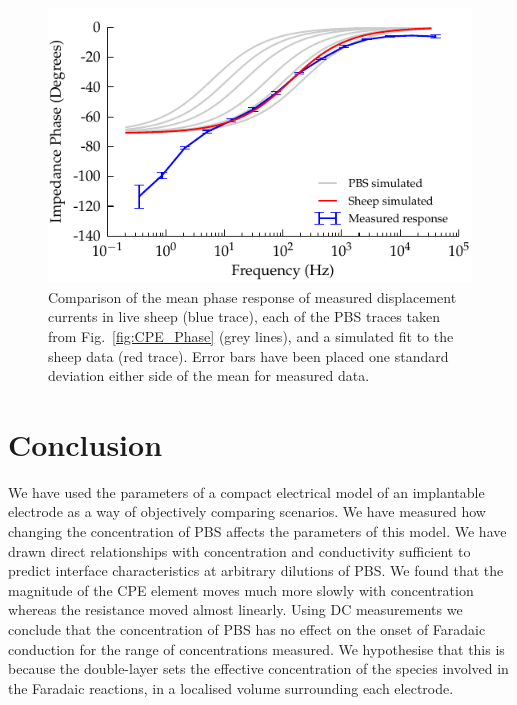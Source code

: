 \documentclass[journal, a4paper]{IEEEtran}
\begin{document}
\begin{figure}
    \begin{center}
        \includegraphics{graphics/displacement-withSheep_impedanceVsFrequency_phase}
    \end{center}
    \caption{Comparison of the mean phase response of measured displacement currents in live sheep (blue trace), each of the PBS traces taken from Fig.~\ref{fig:CPE_Phase} (grey lines), and a simulated fit to the sheep data (red trace). Error bars have been placed one standard deviation either side of the mean for measured data.}
    \label{fig:displacement_sheepCPEPhase}
\end{figure}





\section{Conclusion}
\label{sect:conclusion}
We have used the parameters of a compact electrical model of an implantable electrode as a way of objectively comparing scenarios.
We have measured how changing the concentration of PBS affects the parameters of this model.
We have drawn direct relationships with concentration and conductivity sufficient to predict interface characteristics at arbitrary dilutions of PBS.
We found that the magnitude of the CPE element moves much more slowly with concentration whereas the resistance moved almost linearly.
Using DC measurements we conclude that the concentration of PBS has no effect on the onset of Faradaic conduction for the range of concentrations measured. We hypothesise that this is because the double-layer sets the effective concentration of the species involved in the Faradaic reactions, in a localised volume surrounding each electrode.
\end{document}
